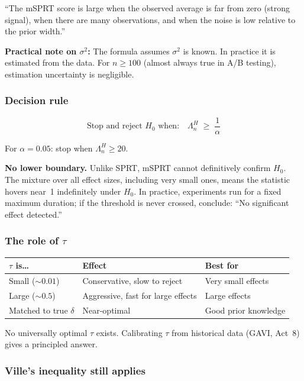 \documentclass[12pt, a4paper]{article}
\newcommand{\LR}{\Lambda}              %
\begin{document}
\begin{plainlanguage}
``The mSPRT score is large when the observed average is far from zero (strong
signal), when there are many observations, and when the noise is low relative
to the prior width.''
\end{plainlanguage}

\textbf{Practical note on $\sigma^2$:} The formula assumes $\sigma^2$ is
known.  In practice it is estimated from the data.  For $n \geq 100$ (almost
always true in A/B testing), estimation uncertainty is negligible.

\subsubsection*{Decision rule}

\[
  \text{Stop and reject } H_0 \text{ when:} \quad
  \boxed{\LR_n^{H} \;\geq\; \frac{1}{\alpha}}
\]

For $\alpha = 0.05$: stop when $\LR_n^{H} \geq 20$.

\textbf{No lower boundary.}
Unlike SPRT, mSPRT cannot definitively confirm $H_0$.  The mixture over all
effect sizes, including very small ones, means the statistic hovers near~1
indefinitely under $H_0$.  In practice, experiments run for a fixed maximum
duration; if the threshold is never crossed, conclude: ``No significant effect
detected.''

\subsubsection*{The role of $\tau$}

\begin{center}
\begin{tabular}{@{} l l l @{}}
\toprule
$\tau$ is\ldots & \textbf{Effect} & \textbf{Best for} \\
\midrule
Small ($\sim\!0.01$) & Conservative, slow to reject & Very small effects \\
Large ($\sim\!0.5$)  & Aggressive, fast for large effects & Large effects \\
Matched to true $\delta$ & Near-optimal & Good prior knowledge \\
\bottomrule
\end{tabular}
\end{center}

No universally optimal $\tau$ exists.  Calibrating $\tau$ from historical data
(GAVI, Act~8) gives a principled answer.

\subsubsection*{Ville's inequality still applies}
\end{document}

